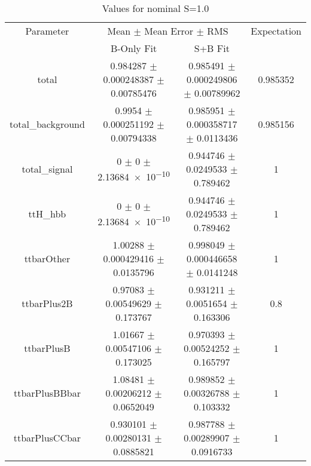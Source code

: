 \begin{table}
\centering
\caption{Values for nominal S=1.0}
\begin{tabular}{cccc}
\toprule
Parameter & \multicolumn{2}{c}{Mean $\pm$ Mean Error $\pm$ RMS} & Expectation\\
 & B-Only Fit & S+B Fit & \\
\midrule
total & \num{0.984287} $\pm$ \num{0.000248387} $\pm$ \num{0.00785476} & \num{0.985491} $\pm$ \num{0.000249806} $\pm$ \num{0.00789962} & \num{0.985352}\\
total\_background & \num{0.9954} $\pm$ \num{0.000251192} $\pm$ \num{0.00794338} & \num{0.985951} $\pm$ \num{0.000358717} $\pm$ \num{0.0113436} & \num{0.985156}\\
total\_signal & \num{0} $\pm$ \num{0} $\pm$ \num{2.13684e-10} & \num{0.944746} $\pm$ \num{0.0249533} $\pm$ \num{0.789462} & \num{1}\\
ttH\_hbb & \num{0} $\pm$ \num{0} $\pm$ \num{2.13684e-10} & \num{0.944746} $\pm$ \num{0.0249533} $\pm$ \num{0.789462} & \num{1}\\
ttbarOther & \num{1.00288} $\pm$ \num{0.000429416} $\pm$ \num{0.0135796} & \num{0.998049} $\pm$ \num{0.000446658} $\pm$ \num{0.0141248} & \num{1}\\
ttbarPlus2B & \num{0.97083} $\pm$ \num{0.00549629} $\pm$ \num{0.173767} & \num{0.931211} $\pm$ \num{0.0051654} $\pm$ \num{0.163306} & \num{0.8}\\
ttbarPlusB & \num{1.01667} $\pm$ \num{0.00547106} $\pm$ \num{0.173025} & \num{0.970393} $\pm$ \num{0.00524252} $\pm$ \num{0.165797} & \num{1}\\
ttbarPlusBBbar & \num{1.08481} $\pm$ \num{0.00206212} $\pm$ \num{0.0652049} & \num{0.989852} $\pm$ \num{0.00326788} $\pm$ \num{0.103332} & \num{1}\\
ttbarPlusCCbar & \num{0.930101} $\pm$ \num{0.00280131} $\pm$ \num{0.0885821} & \num{0.987788} $\pm$ \num{0.00289907} $\pm$ \num{0.0916733} & \num{1}\\
\bottomrule
\end{tabular}
\end{table}